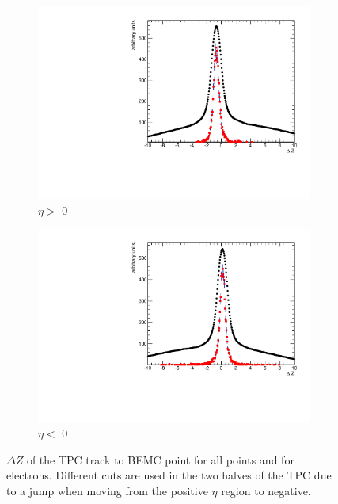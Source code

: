 \begin{figure}[htbp]
	\begin{center}
    \begin{subfigure}{0.65\textwidth}
        \includegraphics[width=\textwidth]{Plots/NPE/dZ_pos.pdf}
        \caption{$\eta >$ 0}
        \label{fig:dZpos}
    \end{subfigure}
    \begin{subfigure}{0.65\textwidth}
        \includegraphics[width=\textwidth]{Plots/NPE/dZ_neg.pdf}
        \caption{$\eta <$ 0}
        \label{fig:dXneg}
    \end{subfigure}
	\end{center}
\caption[TPC to BEMC $\Delta Z$]{$\Delta Z$ of the TPC track to BEMC point for all points and for electrons. Different cuts are used in the two halves of the TPC due to a jump when moving from the positive $\eta$ region to negative.}
\label{fig:dZ}
\end{figure}

